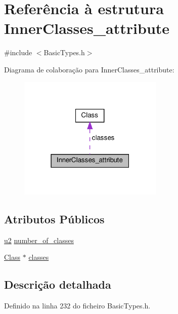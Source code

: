 \hypertarget{structInnerClasses__attribute}{}\section{Referência à estrutura Inner\+Classes\+\_\+attribute}
\label{structInnerClasses__attribute}


{\ttfamily \#include $<$Basic\+Types.\+h$>$}



Diagrama de colaboração para Inner\+Classes\+\_\+attribute\+:
\nopagebreak
\begin{figure}[H]
\begin{center}
\leavevmode
\includegraphics[width=195pt]{structInnerClasses__attribute__coll__graph}
\end{center}
\end{figure}
\subsection*{Atributos Públicos}
\begin{DoxyCompactItemize}
\item 
\hyperlink{BasicTypes_8h_a732cde1300aafb73b0ea6c2558a7a54f}{u2} \hyperlink{structInnerClasses__attribute_ae1ab3ffc94d37479a2f58cb801674191}{number\+\_\+of\+\_\+classes}
\item 
\hyperlink{structClass}{Class} $\ast$ \hyperlink{structInnerClasses__attribute_ab9d6da51f62c9886a96d40719c81b103}{classes}
\end{DoxyCompactItemize}


\subsection{Descrição detalhada}


Definido na linha 232 do ficheiro Basic\+Types.\+h.



